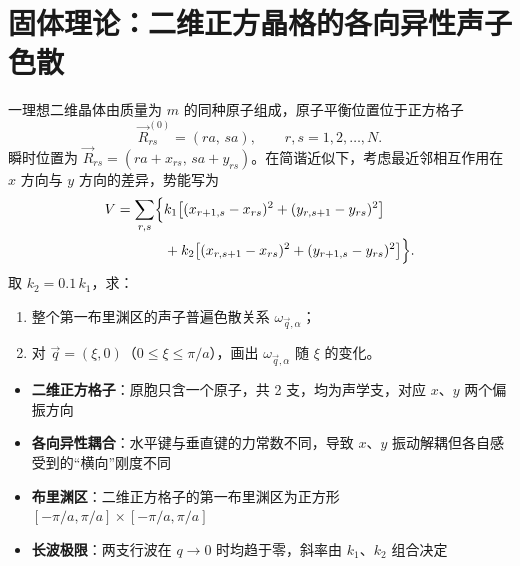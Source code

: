 \section{固体理论：二维正方晶格的各向异性声子色散}
\label{sec:2d-square-phonon}

\begin{modelbox}[题目：理想二维晶体的简正模式]
一理想二维晶体由质量为 $m$ 的同种原子组成，原子平衡位置位于正方格子
\[
\vec R_{rs}^{(0)} = (ra,\, sa), \qquad r,s = 1,2,\dots,N.
\]
瞬时位置为 $\vec R_{rs} = (ra+x_{rs},\, sa+y_{rs})$。在简谐近似下，考虑最近邻相互作用在 $x$ 方向与 $y$ 方向的差异，势能写为
\begin{equation}
\begin{aligned}
V = \sum_{r,s}\Bigl\{ &k_1\bigl[(x_{r+1,s}-x_{rs})^2 + (y_{r,s+1}-y_{rs})^2\bigr] \\
&+ k_2\bigl[(x_{r,s+1}-x_{rs})^2 + (y_{r+1,s}-y_{rs})^2\bigr] \Bigr\}.
\end{aligned}
\end{equation}
取 $k_2 = 0.1\,k_1$，求：
\begin{enumerate}
    \item 整个第一布里渊区的声子普遍色散关系 $\omega_{\vec q,\alpha}$；
    \item 对 $\vec q=(\xi,0)$（$0\le\xi\le\pi/a$），画出 $\omega_{\vec q,\alpha}$ 随 $\xi$ 的变化。
\end{enumerate}
\end{modelbox}

\begin{tipbox}[考点快速分析]
\begin{itemize}
    \item \textbf{二维正方格子}：原胞只含一个原子，共 2 支，均为声学支，对应 $x$、$y$ 两个偏振方向
    \item \textbf{各向异性耦合}：水平键与垂直键的力常数不同，导致 $x$、$y$ 振动解耦但各自感受到的``横向''刚度不同
    \item \textbf{布里渊区}：二维正方格子的第一布里渊区为正方形 $[-\pi/a,\pi/a]\times[-\pi/a,\pi/a]$
    \item \textbf{长波极限}：两支行波在 $q\to0$ 时均趋于零，斜率由 $k_1$、$k_2$ 组合决定
\end{itemize}
\end{tipbox}

